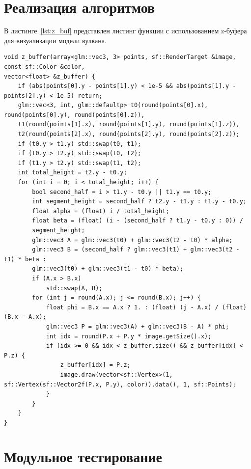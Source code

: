 \section{Реализация алгоритмов}

В листинге~\ref{lst:z_buf} представлен листинг функции с использованием z-буфера для визуализации модели вулкана.
\clearpage 
\begin{lstlisting}[caption={Функция использующая z-буфер для визуализации треугольника},label={lst:z_buf}]
void z_buffer(array<glm::vec3, 3> points, sf::RenderTarget &image, const sf::Color &color,
vector<float> &z_buffer) {
	if (abs(points[0].y - points[1].y) < 1e-5 && abs(points[1].y - points[2].y) < 1e-5) return;
	glm::vec<3, int, glm::defaultp> t0(round(points[0].x), round(points[0].y), round(points[0].z)),
	t1(round(points[1].x), round(points[1].y), round(points[1].z)),
	t2(round(points[2].x), round(points[2].y), round(points[2].z));
	if (t0.y > t1.y) std::swap(t0, t1);
	if (t0.y > t2.y) std::swap(t0, t2);
	if (t1.y > t2.y) std::swap(t1, t2);
	int total_height = t2.y - t0.y;
	for (int i = 0; i < total_height; i++) {
		bool second_half = i > t1.y - t0.y || t1.y == t0.y;
		int segment_height = second_half ? t2.y - t1.y : t1.y - t0.y;
		float alpha = (float) i / total_height;
		float beta = (float) (i - (second_half ? t1.y - t0.y : 0)) /
		segment_height;
		glm::vec3 A = glm::vec3(t0) + glm::vec3(t2 - t0) * alpha;
		glm::vec3 B = (second_half ? glm::vec3(t1) + glm::vec3(t2 - t1) * beta :
		glm::vec3(t0) + glm::vec3(t1 - t0) * beta);
		if (A.x > B.x) 
			std::swap(A, B);
		for (int j = round(A.x); j <= round(B.x); j++) {
			float phi = B.x == A.x ? 1. : (float) (j - A.x) / (float) (B.x - A.x);
			glm::vec3 P = glm::vec3(A) + glm::vec3(B - A) * phi;
			int idx = round(P.x + P.y * image.getSize().x);
			if (idx >= 0 && idx < z_buffer.size() && z_buffer[idx] < P.z) {
				z_buffer[idx] = P.z;
				image.draw(vector<sf::Vertex>(1, sf::Vertex(sf::Vector2f(P.x, P.y), color)).data(), 1, sf::Points);
			}
		}
	}
}

\end{lstlisting}

\section{Модульное тестирование}


